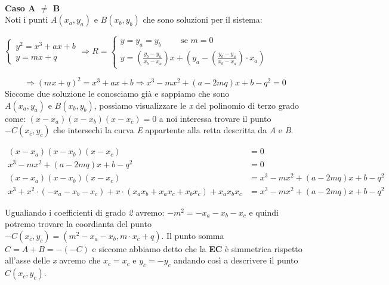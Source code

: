 \   \\
\textbf{Caso A $\neq$ B} \\
Noti i punti $A(x_a, y_a) \text{ e } B(x_b, y_b)$ che sono soluzioni per il sistema:
\begin{center}
    \begin{math}
        \begin{cases}
            y^2 = x^3 + ax + b \\
            y = mx + q
        \end{cases}
        \Rightarrow R = 
        \begin{cases}
            y = y_a = y_b \qquad \text{ se } m = 0 \\
            y = (\frac{y_b - y_a}{x_b - x_a})x + (y_a - (\frac{y_b - y_a}{x_b - x_a}) \cdot x_a)
        \end{cases}
    \end{math}
\end{center}
$$\Rightarrow (mx + q)^2 = x^3 + ax + b \Rightarrow x^3 - mx^2 + (a - 2mq)x + b - q^2 = 0$$
Siccome due soluzione le conosciamo già e sappiamo che sono $A(x_a, y_a) \text{ e } B(x_b, y_b)$, possiamo visualizzare le \textit{x} del polinomio di terzo grado come: $(x - x_a)(x - x_b)(x - x_{\overline{c}}) = 0$ a noi interessa trovare il punto $-C(x_{\overline{c}}, y_{\overline{c}})$ che intersechi la curva \textit{E} appartente alla retta descritta da \textit{A} e \textit{B}.
\begin{center}
    \begin{math}
        \begin{aligned}
            (x - x_a)(x - x_b)(x - x_c) &= 0 \\
            x^3 - mx^2 + (a - 2mq)x + b - q^2 &= 0 \\
            (x - x_a)(x - x_b)(x - x_c) &= x^3 - mx^2 + (a - 2mq)x + b - q^2 \\
            x^3 + x^2 \cdot (- x_a - x_b - x_c) + x \cdot (x_a x_b + x_a x_c + x_b x_c) + x_a x_b x_c &= x^3 - mx^2 + (a - 2mq)x + b - q^2
        \end{aligned}
    \end{math}
\end{center}
Ugualiando i coefficienti di grado \textit{2} avremo: $-m^2 = - x_a - x_b - x_c$ e quindi potremo trovare la coordianta del punto $-C(x_{\overline{c}}, y_{\overline{c}}) = (m^2 - x_a - x_b, m \cdot x_{\overline{c}} + q)$. Il punto somma $C = A + B = -(-C)$ e siccome abbiamo detto che la \textbf{EC} è simmetrica rispetto all'asse delle \textit{x} avremo che $x_{\overline{c}} = x_c$ e $y_{\overline{c}} = -y_c$ andando così a descrivere il punto $C(x_c, y_c)$.
